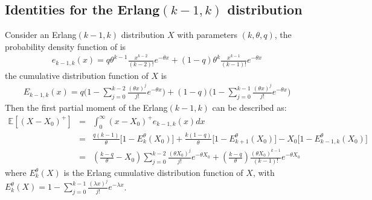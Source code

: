 \documentclass[preprint,12pt]{elsarticle}
\begin{document}
\begin{appendices}
\subsection{Identities for the Erlang$(k-1,k)$ distribution}
Consider an Erlang$(k-1,k)$ distribution $X$ with parameters $(k,\theta,q)$, the probability density function of is
\begin{eqnarray}
e_{k-1,k}(x)=q\theta^{k-1}\frac{x^{k-2}}{(k-2)!}e^{-\theta x} + (1-q)\theta^{k}\frac{x^{k-1}}{(k-1)!}e^{-\theta x} \nonumber
\end{eqnarray}
the cumulative distribution function of $X$ is
\begin{eqnarray}
E_{k-1,k}(x)=q\bigg(1-\sum_{j=0}^{k-2}\frac{(\theta x)^{j}}{j!}e^{-\theta x} \bigg)+(1-q)\bigg(1-\sum_{j=0}^{k-1}\frac{(\theta x)^{j}}{j!}e^{-\theta x} \bigg) \nonumber
\end{eqnarray}
Then the first partial moment of the Erlang$(k-1,k)$ can be described as:
\begin{eqnarray}
\mathbb{E}{[(X-X_{0})^{+}]} &=& \int_{0}^{\infty}{(x-X_{0})^{+}e_{k-1,k}(x)d x} \nonumber\\
&=& \frac{q(k-1)}{\theta}\bigg[1-E_{k}^{\theta}(X_{0})\bigg]+\frac{k(1-q)}{\theta}\bigg[1-E_{k+1}^{\theta}(X_{0})\bigg]-X_{0}\bigg[1-E_{k-1,k}^{\theta}(X_{0})\bigg] \nonumber\\
&=&(\frac{k-q}{\theta}-X_{0})\sum_{j=0}^{k-2}{\frac{(\theta X_{0})^j}{j!}e^{-\theta X_{0}}}+(\frac{k-q}{\theta})\frac{(\theta X_{0})^{k-1}}{(k-1)!}e^{-\theta X_{0}}\nonumber
\end{eqnarray}
where $E_{k}^{\theta}(X)$ is the Erlang cumulative distribution function of $X$, with $E_{k}^{\theta}(X) = 1-\sum_{j=0}^{k-1}{\frac{(\lambda x)^{j}}{j!}e^{-\lambda x}}$.


\end{appendices}
\end{document}
